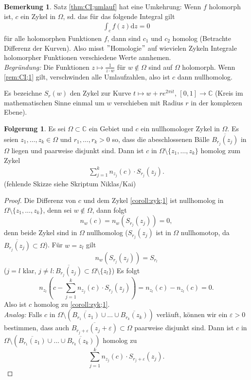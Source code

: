 \documentclass[11pt,titlepage]{article}
\theoremstyle{definition}
\newtheorem{corollary}[theorem]{Folgerung}
\newtheorem{remark}[theorem]{Bemerkung}
\theoremstyle{remark}
\begin{document}
	\begin{remark}
		Satz \ref{thm:CI;umlauf} hat eine Umkehrung: Wenn $f$ holomorph ist, $c$ ein Zykel in $\Omega$, sd. 
		das für das folgende Integral gilt
		\begin{eqnarray}
			\int_c f(z)\mathrm{d}z=0 \label{rem:CI;1}
		\end{eqnarray}
		für alle holomorphen Funktionen $f$, dann sind $c_1$ und $c_2$ homolog (Betrachte Differenz der 
		Kurven). Also misst $"$Homologie$"$ auf wievielen Zykeln Integrale holomorpher Funktionen 
		verschiedene Werte annhemen. \\
		\textsl{Begründung:} Die Funktionen $z\mapsto \frac{1}{z\cdot w}$ für $w\notin\Omega$ sind auf 
		$\Omega$ holomorph. Wenn \ref{rem:CI;1} gilt, verschwinden alle Umlaufzahlen, also ist $c$ dann 
		nullhomolog.
	\end{remark}
	
	Es bezeichne $S_r (w)$ den Zykel zur Kurve $t\mapsto w+re^{2\pi it}$, $[0,1]\to\mathbb{C}$ 
	(Kreis im mathematischen Sinne einmal um $w$ verschieben mit Radius $r$ in der komplexen Ebene).
	
	\begin{corollary}
		Es sei $\Omega\subset\mathbb{C}$ ein Gebiet und $c$ ein nullhomologer Zykel in $\Omega$. 
		Es seien $z_1,\ldots,z_k\in\Omega$ und $r_1,\ldots,r_k >0$ so, dass die abeschlossenen 
		Bälle $\overline{B_{r_j}(z_j)}$ in $\Omega$ liegen und paarweise disjunkt sind. 
		Dann ist $c$ in $\Omega\setminus\{z_1,\ldots,z_k\}$ homolog zum Zykel
		\begin{eqnarray}
			\sum_{j=1}^k n_{z_j}(c)\cdot S_{r_j}(z_j). \label{coroll:zyk;1}
		\end{eqnarray}
		(fehlende Skizze siehe Skriptum Niklas/Kai)\\
	\end{corollary}
	
	\begin{proof}
		Die Differenz von $c$ und dem Zykel \ref{coroll:zyk;1} ist nullhomolog in $\Omega\setminus\{z_1,\ldots,
		z_k\}$, denn sei $w\notin\Omega$, dann folgt
		\[ n_w(c)=n_w (S_{r_j}(z_j))=0, \]
		denn beide Zykel sind in $\Omega$ nullhomolog ($S_{r_j}(z_j)$ ist in $\Omega$ nullhomotop, da 
		$\overline{B_{r_j}(z_j)}\subset\Omega$). Für $w=z_l$ gilt
		\[ n_w(S_{r_j}(z_j))=S_{r_l} \]
		($j=l$ klar, $j\neq l:\overline{B_{r_j}(z_j)}\subset\Omega\setminus\{z_l\}$) Es folgt
		\[ n_{z_l}\left(c-\sum_{j=1}^k n_{z_j}(c)\cdot S_{r_j}(z_j)\right)=n_{z_l}(c)-n_{z_l}(c)=0. \]
		Also ist $c$ homolog zu \ref{coroll:zyk;1}.\\
		\textsl{Analog:} Falls $c$ in $\Omega\setminus\left( \overline{B_{r_1}(z_1)}\cup\ldots\cup
		\overline{B_{r_k}(z_k)}\right)$ verläuft, können wir ein $\varepsilon>0$ bestimmen, dass auch 
		$\overline{B_{r_j +\varepsilon}(z_j +\varepsilon)}\subset\Omega$ paarweise disjunkt sind. 
		Dann ist $c$ in $\Omega\setminus\left( \overline{B_{r_1}(z_1)}\cup\ldots\cup
		\overline{B_{r_k}(z_k)}\right)$ homolog zu
		\[ \sum_{j=1}^k n_{z_j}(c)\cdot S_{r_j +\varepsilon}(z_j). \]
	\end{proof}
	
\end{document}
